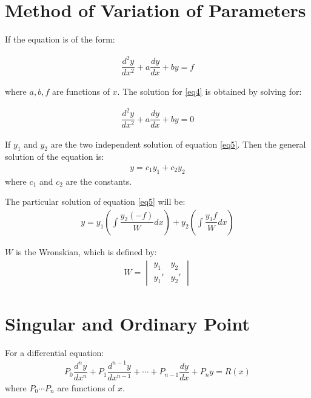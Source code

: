 \documentclass[../main.tex]{subfile}
\begin{document}
        \section{Method of Variation of Parameters}
        If the equation is of the form:
        
        \begin{align}
            \dfrac{d^2y}{dx^2} + a \dfrac{dy}{dx} + b y = f \label{eq4}
        \end{align}
        
        where $a,b,f$ are functions of $x$. The solution for \ref{eq4} is obtained by solving for:
        
        \begin{align} \label{eq5}
            \dfrac{d^2y}{dx^2} + a\dfrac{dy}{dx} + b y = 0
        \end{align}
        
        If $y_1$ and $y_2$ are the two independent solution of equation \ref{eq5}.\newline
        Then the general solution of the equation is:
        \begin{align}
            y = c_1 y_1 + c_2 y_2
        \end{align}
        where $c_1$ and $c_2$ are the constants.\newline
        
        The particular solution of equation \ref{eq5} will be:
        \begin{align}
            y = y_1 \left( \int \dfrac{y_2(-f)}{W} dx \right) + y_2 \left( \int \dfrac{y_1 f}{W} dx \right)
        \end{align}
        
        $W$ is the Wronskian, which is defined by:
        \begin{align}
        W = \begin{vmatrix}
                y_1 & y_2\\
                y_1' & y_2'
            \end{vmatrix}
        \end{align}

        \section{Singular and Ordinary Point}
        For a differential equation:
        \begin{align}
            P_0 \dfrac{d^n y}{dx^n}+P_1 \dfrac{d^{n-1}y}{dx^{n-1}}+\cdots+P_{n-1} \dfrac{dy}{dx}+P_n y=R(x)
        \end{align}
        where $P_0 \cdots P_n$ are functions of $x$.\newline
\end{document}
